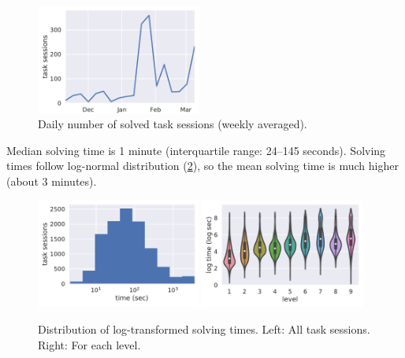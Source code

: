 \begin{figure}[htb]
\centering
\includegraphics[width=0.48\textwidth]{img/daily-task-sessions}
\caption{Daily number of solved task sessions (weekly averaged).}
\label{fig:daily-task-sessions}
\end{figure}

Median solving time is 1 minute (interquartile range: 24--145 seconds).
Solving times follow log-normal distribution (\cref{fig:solving-times}),
so the mean solving time is much higher
(about 3 minutes). %


\begin{figure}[htb]
\centering
\includegraphics[width=0.48\textwidth]{img/task-sessions-time-log}
\includegraphics[width=0.48\textwidth]{img/levels-time}
\caption{%
  Distribution of log-transformed solving times.
  Left: All task sessions.
  Right: For each level.}
\label{fig:solving-times}
\end{figure}

